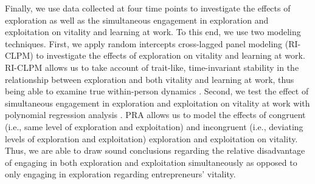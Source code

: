 \documentclass[man, 12pt, a4paper, noextraspace]{apa6}
\begin{document}
Finally, we use data collected at four time points to investigate the effects of exploration as well as the simultaneous engagement in exploration and exploitation on vitality and learning at work.
To this end, we use two modeling techniques. 
First, we apply random intercepts cross-lagged panel modeling (RI-CLPM) to investigate the effects of exploration on vitality and learning at work. 
RI-CLPM allows us to take account of trait-like, time-invariant stability in the relationship between exploration and both vitality and learning at work, thus being able to examine true within-person dynamics \parencite{Hamaker.2015}. 
Second, we test the effect of simultaneous engagement in exploration and exploitation on vitality at work with polynomial regression analysis \parencite[PRA;][]{Edwards.1993a, Schonbrodt2018, Humberg2019}. 
PRA allows us to model the effects of congruent (i.e., same level of exploration and exploitation) and incongruent (i.e., deviating levels of exploration and exploitation) exploration and exploitation on vitality. Thus, we are able to draw sound conclusions regarding the relative disadvantage of engaging in both exploration and exploitation simultaneously as opposed to only engaging in exploration regarding entrepreneurs' vitality. 
\end{document}
